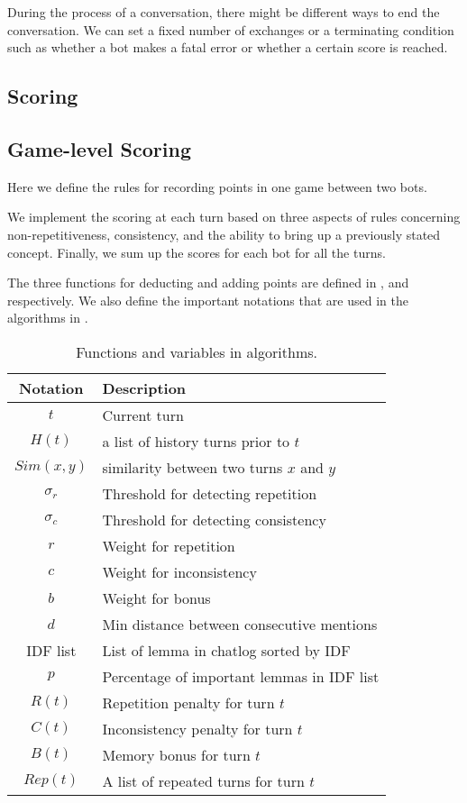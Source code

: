 During the process of a conversation, there might be different ways to 
end the conversation. We can set a fixed number of exchanges 
or a terminating condition such as whether a bot makes a fatal error
or whether a certain score is reached.

\subsection{Scoring}
\label{ssec:scoring}
\subsection*{Game-level Scoring}

Here we define the rules for recording points in one game between two bots. 

We implement the scoring at each turn based on three aspects of rules concerning non-repetitiveness, consistency, and the ability to bring up a previously stated concept. Finally, we sum up the scores for each bot for all the turns.

The three functions for deducting and adding points are defined in ,  and  respectively. 
We also define the important notations that are used in the algorithms in
. 
\begin{table}[th!]
\centering
\small
\begin{tabular}{c|l}
\toprule
\textbf{Notation} & \textbf{Description} \\ \midrule
$t$ & Current turn \\
$H(t)$  &  a list of history turns prior to $t$ \\
$Sim(x,y)$ & similarity between two turns $x$ and $y$ \\
$\sigma_r$ & Threshold for detecting repetition \\
$\sigma_c$ & Threshold for detecting consistency \\
$r$ & Weight for repetition \\
$c$ & Weight for inconsistency \\
$b$ & Weight for bonus \\
$d$ & Min distance between consecutive mentions \\
IDF list & List of lemma in chatlog sorted by IDF\\
$p$ & Percentage of important lemmas in IDF list\\
$R(t)$ &  Repetition penalty for turn $t$ \\
$C(t)$ &  Inconsistency penalty for turn $t$ \\ 
$B(t)$ &  Memory bonus for turn $t$ \\
$Rep(t)$ & A list of repeated turns for turn $t$ \\  
\bottomrule
\end{tabular}
\caption{
Functions and variables in algorithms.}
\label{tab:functions}
\end{table}





